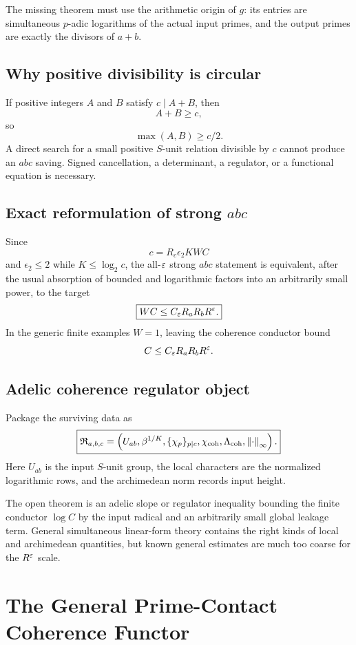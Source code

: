 The missing theorem must use the arithmetic origin of $g$: its entries are simultaneous $p$-adic logarithms of the actual input primes, and the output primes are exactly the divisors of $a+b$.

\section{Why positive divisibility is circular}
If positive integers $A$ and $B$ satisfy $c\mid A+B$, then
\[
 A+B\ge c,
\]
so
\[
 \max(A,B)\ge c/2.
\]
A direct search for a small positive $S$-unit relation divisible by $c$ cannot produce an $abc$ saving. Signed cancellation, a determinant, a regulator, or a functional equation is necessary.

\section{Exact reformulation of strong \texorpdfstring{$abc$}{abc}}
Since
\[
 c=R_c\epsilon_2KWC
\]
and $\epsilon_2\le2$ while $K\le\log_2c$, the all-$\varepsilon$ strong $abc$ statement is equivalent, after the usual absorption of bounded and logarithmic factors into an arbitrarily small power, to the target
\[
 \boxed{
 WC
 \le
 C_\varepsilon R_aR_bR^\varepsilon.
 }
\]
In the generic finite examples $W=1$, leaving the coherence conductor bound
\[
 C\le C_\varepsilon R_aR_bR^\varepsilon.
\]

\section{Adelic coherence regulator object}
Package the surviving data as
\[
 \boxed{
 \mathfrak R_{a,b,c}
 =
 \left(
 U_{ab},
 \beta^{1/K},
 \{\chi_p\}_{p\mid c},
 \chi_{\mathrm{coh}},
 \Lambda_{\mathrm{coh}},
 \left\lVert\cdot\right\rVert_\infty
 \right).
 }
\]
Here $U_{ab}$ is the input $S$-unit group, the local characters are the normalized logarithmic rows, and the archimedean norm records input height.

The open theorem is an adelic slope or regulator inequality bounding the finite conductor $\log C$ by the input radical and an arbitrarily small global leakage term. General simultaneous linear-form theory contains the right kinds of local and archimedean quantities, but known general estimates are much too coarse for the $R^\varepsilon$ scale.

\chapter{The General Prime-Contact Coherence Functor}

